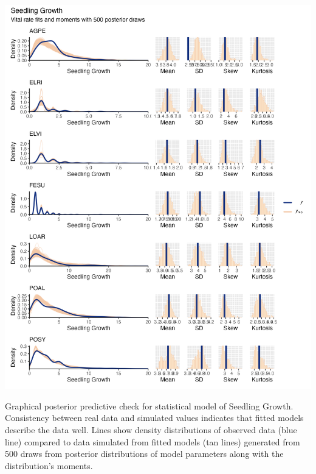 \documentclass[lineno, sn-basic]{sn-jnl}%
\providecommand{\DIFadd}[1]{{\protect\color{blue}#1}} %
\providecommand{\DIFadd}[1]{{\protect\color{blue}\uwave{#1}}} %
\providecommand{\DIFaddFL}[1]{\DIFadd{#1}} %
\begin{document}
\begin{myfigure}[H]
	\centering
	\includegraphics[width = \linewidth]{seedgrowbyspecies_densplot.png}
	\caption[Graphical posterior predictive check for statistical model of Seedling Growth]{\DIFaddFL{Graphical posterior predictive check for statistical model of Seedling Growth. Consistency between real data and simulated values indicates that fitted models describe the data well. Lines show density distributions of observed data (blue line) compared to data simulated from fitted models (tan lines) generated from 500 draws from posterior distributions of model parameters along with the distribution's moments.}}
\end{myfigure}
\end{document}
